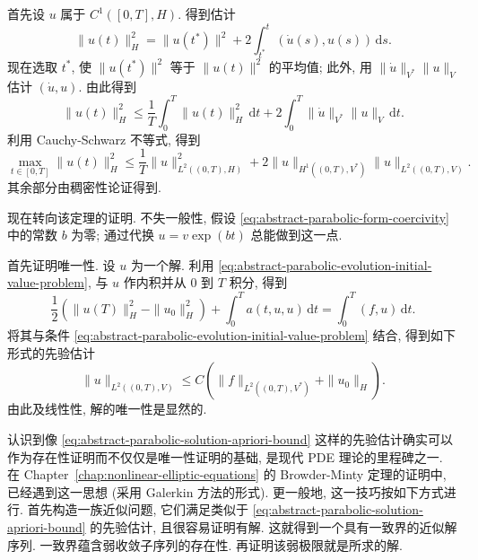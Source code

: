 \begin{Proof}
首先设 $u$ 属于 $C^1([0,T],H)$. 得到估计
\begin{equation}\label{eq:parabolic-energy-space-continuity-identity}
\|u(t)\|_H^2=\|u(t^*)\|^2+2\int_{t^*}^t(\dot u(s),u(s))\,\mathrm{d}s.
\end{equation}
现在选取 $t^*$, 使 $\|u(t^*)\|^2$ 等于 $\|u(t)\|^2$ 的平均值; 此外, 用 $\|\dot u\|_{V^*}\|u\|_V$ 估计 $(\dot u,u)$. 由此得到
\begin{equation}\label{eq:parabolic-energy-space-continuity-integral-bound}
\|u(t)\|_H^2\leq\dfrac{1}{T}\int_0^T\|u(t)\|_H^2\,\mathrm{d}t+2\int_0^T\|\dot u\|_{V^*}\|u\|_V\,\mathrm{d}t.
\end{equation}
利用 Cauchy-Schwarz 不等式, 得到
\begin{equation}\label{eq:parabolic-energy-space-hilbert-continuous-bound}
\max_{t\in[0,T]}\|u(t)\|_H^2\leq\dfrac{1}{T}\|u\|_{L^2((0,T),H)}^2+2\|u\|_{H^1((0,T),V^*)}\|u\|_{L^2((0,T),V)}.
\end{equation}
其余部分由稠密性论证得到.
\end{Proof}

现在转向该定理的证明. 不失一般性, 假设 \eqref{eq:abstract-parabolic-form-coercivity} 中的常数 $b$ 为零; 通过代换 $u=v\exp(bt)$ 总能做到这一点.\par 首先证明唯一性. 设 $u$ 为一个解. 利用 \eqref{eq:abstract-parabolic-evolution-initial-value-problem}, 与 $u$ 作内积并从 0 到 $T$ 积分, 得到
\begin{equation}\label{eq:abstract-parabolic-solution-energy-identity}
\dfrac{1}{2}(\|u(T)\|_H^2-\|u_0\|_H^2)+\int_0^T a(t,u,u)\,\mathrm{d}t=\int_0^T(f,u)\,\mathrm{d}t.
\end{equation}
将其与条件 \eqref{eq:abstract-parabolic-evolution-initial-value-problem} 结合, 得到如下形式的先验估计
\begin{equation}\label{eq:abstract-parabolic-solution-apriori-bound}
\|u\|_{L^2((0,T),V)}\leq C(\|f\|_{L^2((0,T),V^*)}+\|u_0\|_H).
\end{equation}
由此及线性性, 解的唯一性是显然的.

认识到像 \eqref{eq:abstract-parabolic-solution-apriori-bound} 这样的先验估计确实可以作为存在性证明而不仅仅是唯一性证明的基础, 是现代 PDE 理论的里程碑之一. 在 Chapter~\ref{chap:nonlinear-elliptic-equations} 的 Browder-Minty 定理的证明中, 已经遇到这一思想 (采用 Galerkin 方法的形式). 更一般地, 这一技巧按如下方式进行. 首先构造一族近似问题, 它们满足类似于 \eqref{eq:abstract-parabolic-solution-apriori-bound} 的先验估计, 且很容易证明有解. 这就得到一个具有一致界的近似解序列. 一致界蕴含弱收敛子序列的存在性. 再证明该弱极限就是所求的解.


